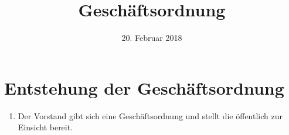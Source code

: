 \documentclass[a4paper, 12pt]{scrartcl}
\title{Geschäftsordnung}
\author{}
\date{20. Februar 2018}
\begin{document}
\maketitle
\sffamily

\section{Entstehung der Geschäftsordnung}
\begin{enumerate}
  \item Der Vorstand gibt sich eine Geschäftsordnung und stellt die öffentlich zur Einsicht bereit.
\end{enumerate}
\end{document}
